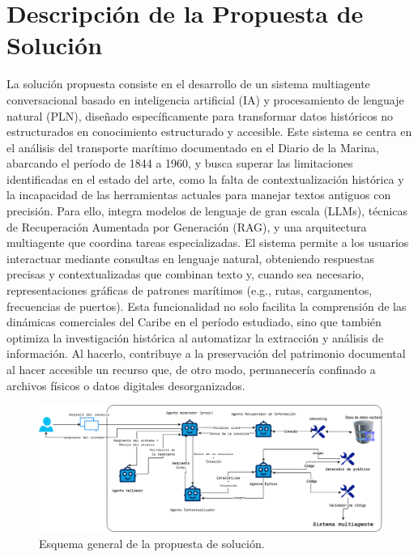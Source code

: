 \section{Descripción de la Propuesta de Solución}
La solución propuesta consiste en el desarrollo de un sistema multiagente conversacional basado en inteligencia artificial (IA) y procesamiento de lenguaje natural (PLN), diseñado específicamente para transformar datos históricos no estructurados en conocimiento estructurado y accesible. Este sistema se centra en el análisis del transporte marítimo documentado en el Diario de la Marina, abarcando el período de 1844 a 1960, y busca superar las limitaciones identificadas en el estado del arte, como la falta de contextualización histórica y la incapacidad de las herramientas actuales para manejar textos antiguos con precisión. Para ello, integra modelos de lenguaje de gran escala (LLMs), técnicas de Recuperación Aumentada por Generación (RAG), y una arquitectura multiagente que coordina tareas especializadas.
El sistema permite a los usuarios interactuar mediante consultas en lenguaje natural, obteniendo respuestas precisas y contextualizadas que combinan texto y, cuando sea necesario, representaciones gráficas de patrones marítimos (e.g., rutas, cargamentos, frecuencias de puertos). Esta funcionalidad no solo facilita la comprensión de las dinámicas comerciales del Caribe en el período estudiado, sino que también optimiza la investigación histórica al automatizar la extracción y análisis de información. Al hacerlo, contribuye a la preservación del patrimonio documental al hacer accesible un recurso que, de otro modo, permanecería confinado a archivos físicos o datos digitales desorganizados.\\
\begin{figure}[h]
	\centering
	\includegraphics[width=1\textwidth]{images/mas}
	\caption{Esquema general de la propuesta de solución.}
	\label{fig:Propuesta de solución}
\end{figure}\\
